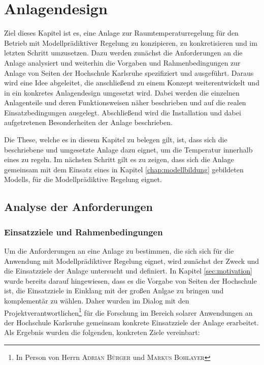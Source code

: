 %
%

\renewcommand{\chapterheadstartvskip}{\vspace*{2cm}}

\chapter{Anlagendesign}
\label{chap:anlagendesign}

\renewcommand{\chapterheadstartvskip}{\vspace*{-0.5cm}}

Ziel dieses Kapitel ist es, eine Anlage zur Raumtemperaturregelung für den Betrieb mit Modellprädiktiver Regelung zu konzipieren, zu konkretisieren und im letzten Schritt umzusetzen. Dazu werden zunächst die Anforderungen an die Anlage analysiert und weiterhin die Vorgaben und Rahmenbedingungen zur Anlage von Seiten der Hochschule Karlsruhe spezifiziert und ausgeführt. Daraus wird eine Idee abgeleitet, die anschließend zu einem Konzept weiterentwickelt und in ein konkretes Anlagendesign umgesetzt wird. Dabei werden die einzelnen Anlagenteile und deren Funktionsweisen näher beschrieben und auf die realen Einsatzbedingungen ausgelegt. Abschließend wird die Installation und dabei aufgetretenen Besonderheiten der Anlage beschrieben.

Die These, welche es in diesem Kapitel zu belegen gilt, ist, dass sich die beschriebene und umgesetzte Anlage dazu eignet, um die Temperatur innerhalb eines zu regeln. Im nächsten Schritt gilt es zu zeigen, dass sich die Anlage gemeinsam mit dem Einsatz eines in Kapitel \ref{chap:modellbildung} gebildeten Modells, für die Modellprädiktive Regelung eignet.

\section{Analyse der Anforderungen}
\label{sec:anforderungen}

\subsection{Einsatzziele und Rahmenbedingungen}
Um die Anforderungen an eine Anlage zu bestimmen, die sich sich für die Anwendung mit Modellprädiktiver Regelung eignet, wird zunächst der Zweck und die Einsatzziele der Anlage untersucht und definiert. In Kapitel \ref{sec:motivation} wurde bereits darauf hingewiesen, dass es die Vorgabe von Seiten der Hochschule ist, die Einsatzziele in Einklang mit der großen Anlgae zu bringen und komplementär zu wählen. Daher wurden im Dialog mit den Projektverantwortlichen\footnote{In Person von Herrn \textsc{Adrian Bürger} und \textsc{Markus Bohlayer}} für die Forschung im Bereich solarer Anwendungen an der Hochschule Karlsruhe gemeinsam konkrete Einsatzziele der Anlage erarbeitet. Als Ergebnis wurden die folgenden, konkreten Ziele vereinbart:
 
